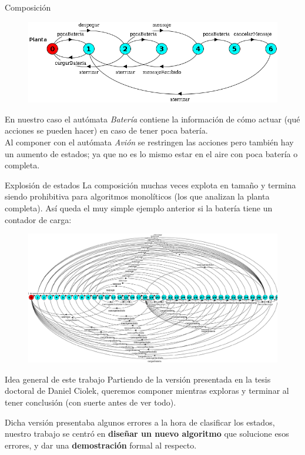 \begin{frame}{Composición}
    \begin{figure}
     \includegraphics[width=\textwidth]{figures/planta.png}
    \end{figure}
    En nuestro caso el autómata \textit{Batería} contiene la información de cómo actuar (qué acciones se pueden hacer) en caso de tener poca batería.\\ 
    Al componer con el autómata \textit{Avión} se restringen las acciones pero también hay un aumento de estados; ya que no es lo mismo estar en el aire con poca batería o completa.
\end{frame}
\begin{frame}{Explosión de estados}
    La composición muchas veces explota en tamaño y termina siendo prohibitiva para algoritmos monolíticos (los que analizan la planta completa). Así queda el muy simple ejemplo anterior si la batería tiene un contador de carga:
    \begin{figure}
    	\includegraphics[width=\textwidth]{figures/big-plant.png}
    \end{figure}
\end{frame}
\begin{frame}{Idea general de este trabajo}
    Partiendo de la versión presentada en la tesis doctoral de Daniel Ciolek, queremos componer mientras exploras y terminar al tener conclusión (con suerte antes de ver todo).
    
    Dicha versión presentaba algunos errores a la hora de clasificar los estados, nuestro trabajo se centró en \textbf{diseñar un nuevo algoritmo} que solucione esos errores, y dar una \textbf{demostración} formal al respecto.
    
\end{frame}
